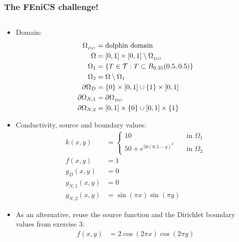 \begin{frame}[shrink=35]
  \frametitle{The FEniCS challenge!}
  \begin{columns}[c]
    \begin{column}{0.5\textwidth}
      \begin{itemize}
        \item Domain: \vspace{-1em}
          \begin{align*}
            \Omega_{_{DO}} &= \text{dolphin domain} \\
                    \Omega &= [0,1]\times[0,1] \setminus \Omega_{_{DO}} \\
                    \Omega_1 &= \{ T \in \mathcal{T} : T \subset
          B_{0.35}(0.5,0.5) \} \\
            \Omega_2 &= \Omega \setminus \Omega_1 \\
            \partial \Omega_D &= \{0\} \times [0,1] \cup \{1\} \times
            [0,1]
            \\
            \partial \Omega_{N,1} &= \partial \Omega_{_{DO}} \\
            \partial \Omega_{N,2} &= [0,1] \times \{0\} \cup
            [0,1] \times \{1\}               
          \end{align*}
        \item  Conductivity, source and boundary values: 
          \vspace{-0.5em}
          \begin{align*}
            k(x,y) &= 
            \begin{cases}
              10 &\quad \text{in } \Omega_1  \\ 
      50 + e^{50(0.5 - y )^2} &\quad \text{in } \Omega_2
            \end{cases}
            \\
            f(x,y) &= 1
            \\
            g_D(x,y) &= 0 \\
        g_{N,1}(x,y) &= 0 \\
        g_{N,2}(x,y) &= \sin(\pi x)\sin(\pi y)
          \end{align*}
        \item As an alternative, reuse the source function and the
          Dirichlet boundary values from exercise 3:
          \begin{align*}
            f(x,y) &= 2\cos(2\pi x)\cos(2\pi y) 
            \\

\end{align*}
\end{itemize}
\end{column}
\end{columns}
\end{frame}
